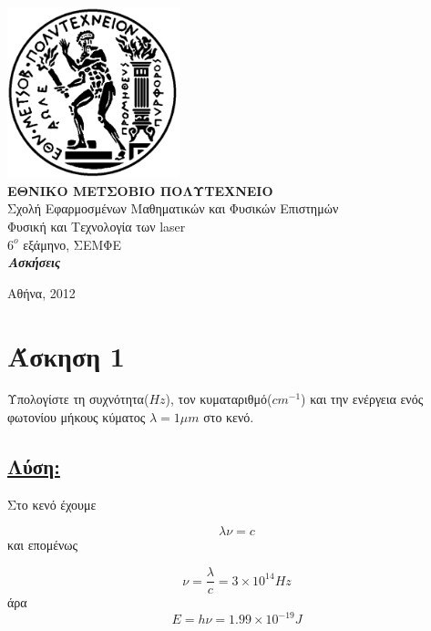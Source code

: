 \documentclass[a4paper,11pt,titlepage]{article}
\numberwithin{equation}{section} %
\begin{document}

\begin{titlepage}
\begin{center}
\includegraphics[width=50mm]{pyrforos.pdf}\\[0.5cm]
\textbf{\LARGE ΕΘΝΙΚΟ ΜΕΤΣΟΒΙΟ ΠΟΛΥΤΕΧΝΕΙΟ}\\
\textrm{\Large Σχολή Εφαρμοσμένων Μαθηματικών και Φυσικών Επιστημών}\\[2.0cm]
\Huge{Φυσική και Τεχνολογία των laser\\}
\Large{\textit{$6^o$} εξάμηνο, ΣΕΜΦΕ}\\[2.0cm]
\Large{\textit{\textbf{Ασκήσεις}}}\\[5.0cm]
\normalsize

\vfill
{Αθήνα, 2012}

\end{center}
\end{titlepage}
\tableofcontents
\newpage

\section{Άσκηση 1}
Υπολογίστε τη συχνότητα($Hz$), τον κυματαριθμό($cm^{-1}$) και την ενέργεια ενός φωτονίου μήκους κύματος $\lambda=1{\mu}m$ στο κενό.

\subsection*{\underline{Λύση:}}

Στο κενό έχουμε 

\begin{equation}
 \lambda\nu=c
\end{equation}
 και επομένως

\begin{equation}
 \nu=\frac{\lambda}{c}=3\times10^{14} Hz
\end{equation}
άρα
\begin{equation}
 E=h\nu=1.99\times10^{-19}J
\end{equation}
\end{document}
